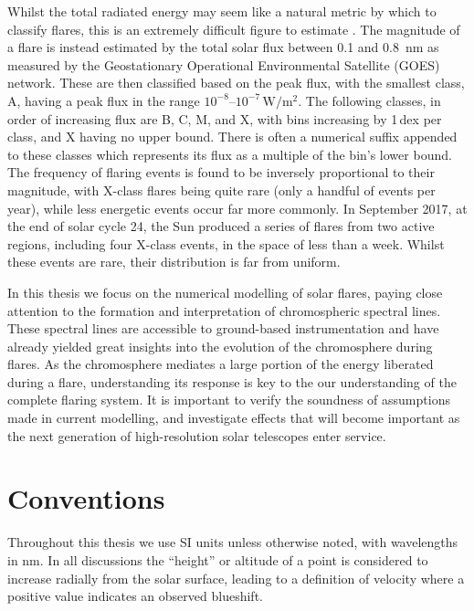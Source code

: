 Whilst the total radiated energy may seem like a natural metric by which to classify flares, this is an extremely difficult figure to estimate \citep[e.g.][]{Milligan2014}.
The magnitude of a flare is instead estimated by the total solar flux between 0.1 and \SI{0.8}{\nano\metre} as measured by the Geostationary Operational Environmental Satellite (GOES) network.
These are then classified based on the peak flux, with the smallest class, A, having a peak flux in the range $10^{-8}$--$10^{-7}\,\si{\watt\per\square\m}$.
The following classes, in order of increasing flux are B, C, M, and X, with bins increasing by 1\,dex per class, and X having no upper bound.
There is often a numerical suffix appended to these classes which represents its flux as a multiple of the bin's lower bound.
The frequency of flaring events is found to be inversely proportional to their magnitude, with X-class flares being quite rare (only a handful of events per year), while less energetic events occur far more commonly.
In September 2017, at the end of solar cycle 24, the Sun produced a series of flares from two active regions, including four X-class events, in the space of less than a week.
Whilst these events are rare, their distribution is far from uniform.

In this thesis we focus on the numerical modelling of solar flares, paying close attention to the formation and interpretation of chromospheric spectral lines.
These spectral lines are accessible to ground-based instrumentation and have already yielded great insights into the evolution of the chromosphere during flares.
As the chromosphere mediates a large portion of the energy liberated during a flare, understanding its response is key to the our understanding of the complete flaring system.
It is important to verify the soundness of assumptions made in current modelling, and investigate effects that will become important as the next generation of high-resolution solar telescopes enter service.


\section{Conventions}

Throughout this thesis we use SI units unless otherwise noted, with wavelengths in \si{\nano\m}.
In all discussions the ``height'' or altitude of a point is considered to increase radially from the solar surface, leading to a definition of velocity where a positive value indicates an observed blueshift.


